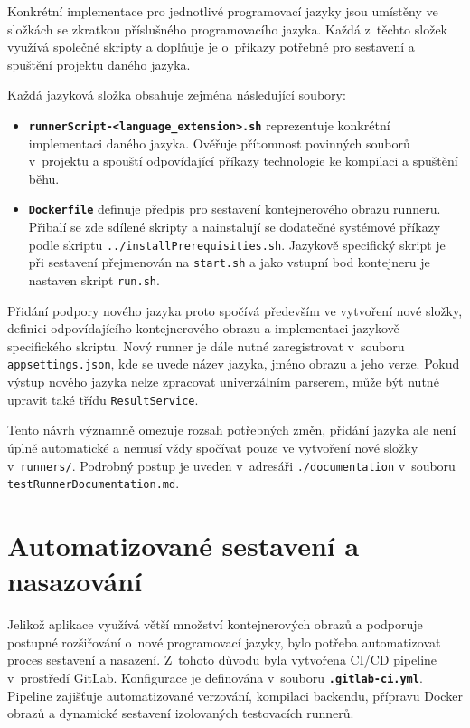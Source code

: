 \documentclass[
  biblatex,
  figures,
  tables,
  glossaries,
  index
]{kidiplom}
\begin{document}
Konkrétní implementace pro jednotlivé programovací jazyky jsou umístěny ve složkách se zkratkou příslušného programovacího jazyka. Každá z~těchto složek využívá společné skripty a doplňuje je o~příkazy potřebné pro sestavení a spuštění projektu daného jazyka.

Každá jazyková složka obsahuje zejména následující soubory:

\begin{itemize}
	\item \textbf{\texttt{runnerScript-<language\_extension>.sh}} reprezentuje konkrétní implementaci daného jazyka. Ověřuje přítomnost povinných souborů v~projektu a spouští odpovídající příkazy technologie ke kompilaci a spuštění běhu.

	\item \textbf{\texttt{Dockerfile}} definuje předpis pro sestavení kontejnerového obrazu runneru. Přibalí se zde sdílené skripty a nainstalují se dodatečné systémové příkazy podle skriptu \texttt{../installPrerequisities.sh}. Jazykově specifický skript je při sestavení přejmenován na \texttt{start.sh} a jako vstupní bod kontejneru je nastaven skript \texttt{run.sh}.
\end{itemize}

Přidání podpory nového jazyka proto spočívá především ve vytvoření nové složky, definici odpovídajícího kontejnerového obrazu a implementaci jazykově specifického skriptu. Nový runner je dále nutné zaregistrovat v~souboru \linebreak{} \texttt{appsettings.json}, kde se uvede název jazyka, jméno obrazu a jeho verze. Pokud výstup nového jazyka nelze zpracovat univerzálním parserem, může být nutné upravit také třídu \texttt{ResultService}.

Tento návrh významně omezuje rozsah potřebných změn, přidání jazyka ale není úplně automatické a nemusí vždy spočívat pouze ve vytvoření nové složky v~\texttt{runners/}. Podrobný postup je uveden v~adresáři \texttt{./documentation} v~souboru \texttt{testRunnerDocumentation.md}.

\newpage

\section{Automatizované sestavení a nasazování}
Jelikož aplikace využívá větší množství kontejnerových obrazů a podporuje postupné rozšiřování o~nové programovací jazyky, bylo potřeba automatizovat proces sestavení a nasazení. Z~tohoto důvodu byla vytvořena CI/CD pipeline v~prostředí GitLab. Konfigurace je definována v~souboru \textbf{\texttt{.gitlab-ci.yml}}. Pipeline zajišťuje automatizované verzování, kompilaci backendu, přípravu Docker obrazů a dynamické sestavení izolovaných testovacích runnerů.
\end{document}
